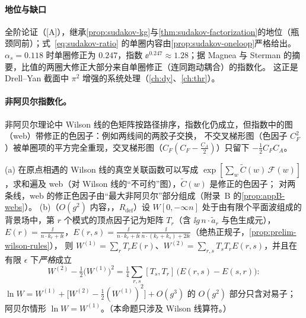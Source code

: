 \paragraph{地位与缺口}全阶论证（[A]），继承\cref{prop:sudakov-kg}与\cref{thm:sudakov-factorization}的地位（瓶颈同前）；式~\eqref{eq:sudakov-ratio} 的单圈内容由\cref{prop:sudakov-oneloop}严格给出。
$\alpha_s=0.118$ 时单圈修正为 $0.247$，指数 $\ee^{0.247}\approx1.28$；据 Magnea 与 Sterman 的摘要，比值的两圈大修正大部分来自单圈修正（连同跑动耦合）的指数化\cite{Magnea:1990zb}。
这正是 Drell--Yan 截面中 $\pi^2$ 增强的系统处理（\cref{ch:dy}、\cref{ch:thr}）。

\paragraph{非阿贝尔指数化。}非阿贝尔理论中 Wilson 线的色矩阵按路径排序，指数化仍成立，但指数中的图（web）带修正的色因子：例如两线间的两胶子交换，
不交叉梯形图（色因子 $C_F^2$）被单圈项的平方完全重现，交叉梯形图（$C_F(C_F-\frac{C_A}2)$）只留下 $-\frac12C_FC_A$。%

\begin{proposition}\label{prop:sudakov-webs}
(a) 在原点相遇的 Wilson 线的真空关联函数可以写成 $\exp[\sum_w\tilde C(w)\,\mathcal F(w)]$，求和遍及 web（对 Wilson 线的“不可约”图），$\tilde C(w)$ 是修正的色因子；
对两条线，web 的修正色因子由“最大非阿贝尔”部分组成\cite{Gatheral1983,FrenkelTaylor1984}（附录~B 的\cref{prop:appB-webs}）。
(b)（$O(g^2)$ 内容，\tagR，$R_{\mathrm{def}}$）设 $W[0,-\infty n]$ 处于由有限个平面波组成的背景场中，第 $r$ 个模式的顶点因子记为矩阵 $T_r$（含 $\ii g\,n\cdot\tilde a_r$ 与色生成元），
$E(r)=\frac{\ii}{n\cdot k_r+\ii\epsilon}$，$E(r,s)=\frac{\ii}{n\cdot k_r+\ii\epsilon}\frac{\ii}{n\cdot(k_r+k_s)+2\ii\epsilon}$（绝热正规子，\cref{prop:prelim-wilson-rules}），
则 $W^{(1)}=\sum_rT_rE(r)$、$W^{(2)}=\sum_{r,s}T_sT_rE(r,s)$，并且在有限 $\epsilon$ 下\emph{严格}成立
\begin{equation}\label{eq:sudakov-web2}
W^{(2)}-\tfrac12\big(W^{(1)}\big)^2=\tfrac14\sum_{r,s}[T_s,T_r]\,\big(E(r,s)-E(s,r)\big):
\end{equation}
$\ln W=W^{(1)}+\big[W^{(2)}-\frac12(W^{(1)})^2\big]+O(g^3)$ 的 $O(g^2)$ 部分只含对易子；阿贝尔情形 $\ln W=W^{(1)}$。（本命题只涉及 Wilson 线算符。）
\end{proposition}

